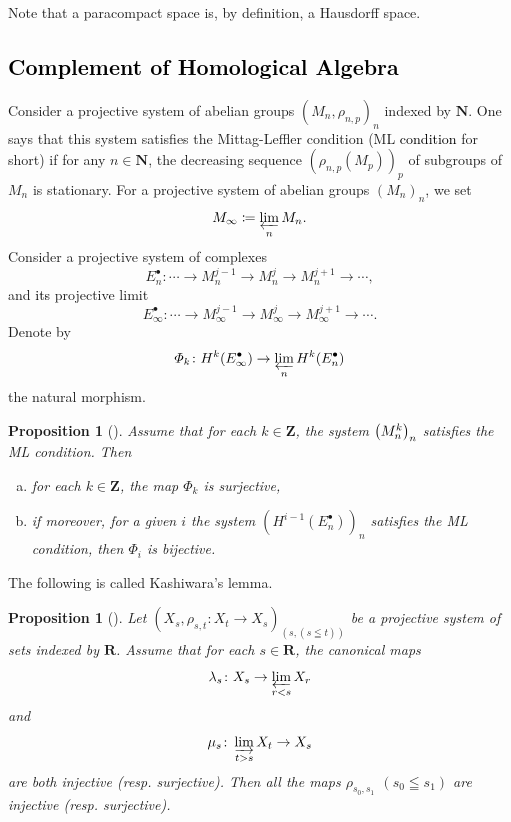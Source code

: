 ﻿\documentclass[a4paper,leqno,dvipdfmx]{jsarticle}
\newtheorem{Proposition+}[Axiom+]{Proposition}
\theoremstyle{definition}
\newcommand{\nn}{\mathbf{N}}
\newcommand{\zz}{\mathbf{Z}}
\newcommand{\rr}{\mathbf{R}}
\numberwithin{equation}{section}
\newcommand{\indlim}[1][]{\mathop{\varinjlim}\limits_{#1}}
\newcommand{\prolim}[1][]{\mathop{\varprojlim}\limits_{#1}}
\theoremstyle{mystyle}
\begin{document}
Note that a paracompact space 
is, by definition, a Hausdorff space. 

\subsection{\textcolor{black}{Complement of Homological Algebra}}\label{ssec:ML}

Consider a projective system of abelian groups \(
  \left(M_n,\rho_{n,p}\right)_n
\) indexed by \(\nn\). 
One says that this system satisfies 
the Mittag-Leffler condition (ML \textcolor{black}{condition} for short) 
if for any \(n\in\nn\), the decreasing sequence \(
  (\rho_{n,p}(M_p))_p
\) of subgroups of \(M_n\) is stationary.
For a projective system of abelian groups \((M_{n})_n\), 
we set \[
  M_{\infty}\coloneqq \prolim[n]M_n.
\]
Consider a projective system of complexes
\begin{equation}
  E_n^{\bullet}\colon 
  \cdots\to M_{n}^{j-1}\to M_{n}^{j}\to M_{n}^{j+1}\to\cdots,
\end{equation}
and \textcolor{black}{its} projective limit
\begin{equation}
  E_{\infty}^{\bullet}\colon 
  \cdots
  \to M_{\infty}^{j-1}
  \to M_{\infty}^{j}
  \to M_{\infty}^{j+1}
  \to\cdots.
\end{equation}
Denote by 
\begin{equation}
  \varPhi_{k}\colon H^{k}(E_{\infty}^{\bullet})\to \prolim[n]H^{k}(E_{n}^{\bullet})
\end{equation}
the natural morphism.

\begin{Proposition+}[{\cite[Proposition 1.12.4]{KS90}}]\label{prop:ks1.12.4}
  Assume that for each \(k\in\zz\), 
  the system \(\left(M_{n}^{\textcolor{black}{k}}\right)_{n}\) satisfies 
  the ML condition. 
  Then
  \begin{enumerate}[(a)]
    \item for each \(k\in \zz\), the map \(\varPhi_k\) is surjective,
    \item if moreover, for a given \(i\) the system \(\left(H^{i-1}(E_{n}^{\bullet})\right)_{n}\) satisfies the ML condition, then \(\varPhi_i\) is bijective.
  \end{enumerate} 
\end{Proposition+}

The following is called Kashiwara's lemma.

\begin{Proposition+}[{\cite[Proposition 1.12.6]{KS90}}]\label{prop:ks1.12.6}
  Let \(\left(X_s,\rho_{s,t}\colon X_t\to X_s\right)_{(s,(s\leqq t))}\) be 
  a projective system of sets indexed by \(\rr\). 
  Assume that for each \(s\in\rr\), the canonical maps\[
    \lambda_s\colon X_s\to\prolim[r<s]X_r
  \] and \[
    \mu_s\colon \indlim[t>s]X_t\to X_s
  \] are both injective (resp. surjective). 
  Then all the maps \(\rho_{s_{0},s_{1}}\) \((s_0\leqq s_1)\) are 
  injective (resp. surjective).
\end{Proposition+}
\end{document}
